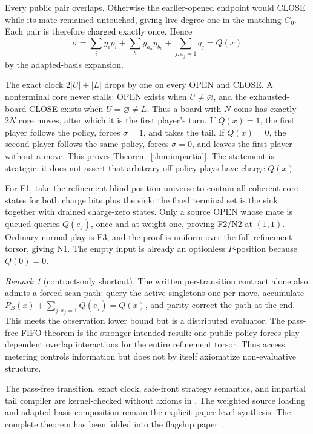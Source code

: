 \documentclass[11pt]{article}
\theoremstyle{definition}
\theoremstyle{remark}
\newtheorem{remark}[theorem]{Remark}
\begin{document}
Every public pair overlaps.  Otherwise the earlier-opened endpoint would
CLOSE while its mate remained untouched, giving live degree one in the
matching $G_0$.  Each pair is therefore charged exactly once.  Hence
\[
 \sigma=\sum_i y_ip_i+\sum_h y_{a_h}y_{b_h}
       +\sum_{j:x_j=1}q_j=Q(x)
\]
by the adapted-basis expansion.

The exact clock $2|U|+|L|$ drops by one on every OPEN and CLOSE.  A
nonterminal core never stalls: OPEN exists when $U\ne\varnothing$, and the
exhausted-board CLOSE exists when $U=\varnothing\ne L$.  Thus a board with
$N$ coins has exactly $2N$ core moves, after which it is the first player's
turn.  If $Q(x)=1$, the first player follows the policy, forces
$\sigma=1$, and takes the tail.  If $Q(x)=0$, the second player follows the
same policy, forces $\sigma=0$, and leaves the first player without a move.
This proves Theorem~\ref{thm:impartial}.  The statement is strategic: it
does not assert that arbitrary off-policy plays have charge $Q(x)$.

For F1, take the refinement-blind position universe to contain all coherent
core states for both charge bits plus the sink; the fixed terminal set is
the sink together with drained charge-zero states.  Only a source OPEN whose
mate is queued queries $Q(e_j)$, once and at weight one, proving F2/N2 at
$(1,1)$.  Ordinary normal play is F3, and the proof is uniform over the
full refinement torsor, giving N1.  The empty input is already an optionless
$P$-position because $Q(0)=0$.

\begin{remark}[contract-only shortcut]
The written per-transition contract alone also admits a forced scan path:
query the active singletons one per move, accumulate
$P_B(x)+\sum_{j:x_j=1}Q(e_j)=Q(x)$, and parity-correct the path at the end.
This meets the observation lower bound but is a distributed evaluator.  The
pass-free FIFO theorem is the stronger intended result: one public policy
forces play-dependent overlap interactions for the entire refinement
torsor.  Thus access metering controls information but does not by itself
axiomatize non-evaluative structure.
\end{remark}

The pass-free transition, exact clock, safe-front strategy semantics, and
impartial tail compiler are kernel-checked without axioms in
.  The weighted source loading and
adapted-basis composition remain the explicit paper-level synthesis.  The
complete theorem has been folded into the flagship paper~\cite{goldarf}.
\end{document}
